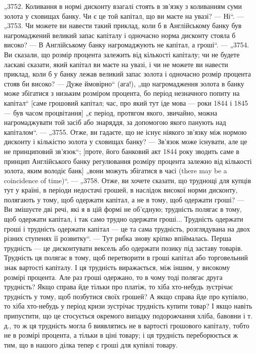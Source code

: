 „3752. Коливання в нормі дисконту взагалі стоять в зв’язку
з коливанням суми золота у сховищах банку. Чи є це той капітал, що ви маєте на увазі? — Ні“. —
„3753. Чи можете ви навести такий приклад, коли б в Англійському банку був нагромаджений великий
запас капіталу і одночасно норма дисконту
стояла б високо? — В Англійському банку нагромаджують не
капітал, а гроші“. — „3754. Ви сказали, що розмір процента залежить від кількості капіталу; чи не
будете ласкаві сказати,
який капітал ви маєте на увазі, і чи не можете ви навести приклад, коли б у банку лежав великий
запас золота і одночасно
розмір процента стояв би високо? — Дуже ймовірно“ (ага!),
„що нагромадження золота в банку може збігатися з низьким розміром процента, бо період незначного
попиту на капітал“
[саме грошовий капітал; час, про який тут іде мова — роки 1844
і 1845 — був часом процвітання] „є період, протягом якого, звичайно,
можна нагромаджувати той засіб або знаряддя, за допомогою якого панують над капіталом“. —
„3755. Отже, ви гадаєте,
що не існує ніякого зв’язку між нормою дисконту і кількістю
золота у сховищах банку? — Зв’язок може існувати, але це не
принциповий зв’язок“; [проте, його банковий акт 1844 року
зводить саме в принцип Англійського банку регулювання розміру процента залежно від кількості золота,
яким володіє банк]
„вони можуть збігатися в часі (there may be a coincidence
of time)“. — „3758. Отже, ви хочете сказати, що труднощі для купців тут у країні, в періоди
недостачі грошей, в наслідок високої
норми дисконту, полягають у тому, щоб одержати капітал, а не
в тому, щоб одержати гроші? — Ви змішуєте дві речі, які я в
цій формі не об’єдную; трудність полягає в тому, щоб одержати капітал, і так само трудно одержати
гроші... Трудність одержати гроші і трудність одержати капітал — це
та сама трудність, розглядувана на двох різних ступенях
її розвитку“. — Тут рибка знову кріпко впіймалась. Перша
трудність — це дисконтувати вексель або одержати позику під
заставу товарів. Трудність ця полягає в тому, щоб перетворити
в гроші капітал або торговельний знак вартості капіталу. І ця
трудність виражається, між іншим, у високому розмірі процента.
Але раз гроші одержано, то в чому тоді полягає друга трудність? Якщо справа йде тільки про платіж,
то хіба хто-небудь
зустрічає трудність у тому, щоб позбутися своїх грошей? А якщо справа йде про купівлю, то хіба
хто-небудь у період кризи
зустрічає трудність купити товар? І якщо навіть припустити,
що це стосується окремого випадку подорожчання хліба, бавовни і т. д., то ж ця трудність могла б
виявлятись не
в вартості грошового капіталу, тобто не в розмірі процента, а
тільки в ціні товару; і ця трудність переборюється ж тим,
що в нашого ділка тепер є гроші для купівлі товару.

